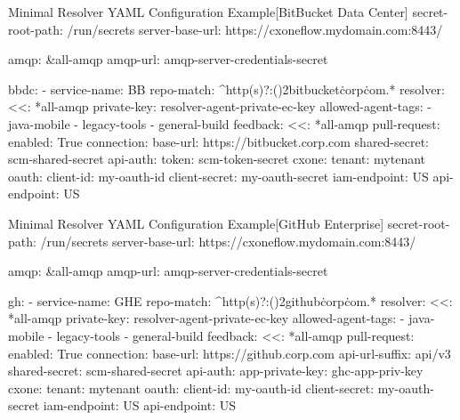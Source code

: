 
\begin{code}{Minimal Resolver YAML Configuration Example}{[BitBucket Data Center]}{}
  secret-root-path: /run/secrets
  server-base-url: https://cxoneflow.mydomain.com:8443/

  amqp: &all-amqp
    amqp-url: amqp-server-credentials-secret

  bbdc:
      - service-name: BB
        repo-match: ^http(s)?:(\/){2}bitbucket\.corp\.com.*
        resolver:
          <<: *all-amqp
          private-key: resolver-agent-private-ec-key
          allowed-agent-tags:
            - java-mobile
            - legacy-tools
            - general-build
        feedback:
          <<: *all-amqp
          pull-request:
            enabled: True
        connection:
          base-url: https://bitbucket.corp.com
          shared-secret: scm-shared-secret
          api-auth:
            token: scm-token-secret
        cxone:
          tenant: mytenant
          oauth:
            client-id: my-oauth-id
            client-secret: my-oauth-secret
          iam-endpoint: US
          api-endpoint: US
\end{code}
  


\begin{code}{Minimal Resolver YAML Configuration Example}{[GitHub Enterprise]}{}
  secret-root-path: /run/secrets
  server-base-url: https://cxoneflow.mydomain.com:8443/

  amqp: &all-amqp
    amqp-url: amqp-server-credentials-secret

  gh:
      - service-name: GHE
        repo-match: ^http(s)?:(\/){2}github\.corp\.com.*
        resolver:
          <<: *all-amqp
          private-key: resolver-agent-private-ec-key
          allowed-agent-tags:
            - java-mobile
            - legacy-tools
            - general-build
        feedback:
          <<: *all-amqp
          pull-request:
            enabled: True
        connection:
          base-url: https://github.corp.com
          api-url-suffix: api/v3
          shared-secret: scm-shared-secret
          api-auth:
            app-private-key: ghc-app-priv-key
        cxone:
          tenant: mytenant
          oauth:
            client-id: my-oauth-id
            client-secret: my-oauth-secret
          iam-endpoint: US
          api-endpoint: US
\end{code}



